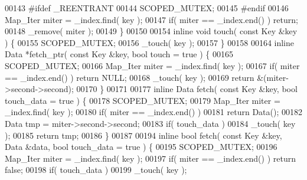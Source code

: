 \begin{DoxyCode}
00143 \textcolor{preprocessor}{#ifdef \_REENTRANT}
00144 \textcolor{preprocessor}{}                        SCOPED\_MUTEX;
00145 \textcolor{preprocessor}{#endif}
00146 \textcolor{preprocessor}{}                        Map_Iter miter = \_index.find( key );
00147                         \textcolor{keywordflow}{if}( miter == \_index.end() ) \textcolor{keywordflow}{return};
00148                         \_remove( miter );
00149                 \}
00150 
00154                 \textcolor{keyword}{inline} \textcolor{keywordtype}{void} touch( \textcolor{keyword}{const} Key &key ) \{
00155                         SCOPED\_MUTEX;
00156                         \_touch( key );
00157                 \}
00158 
00164                 \textcolor{keyword}{inline} Data *fetch_ptr( \textcolor{keyword}{const} Key &key, \textcolor{keywordtype}{bool} touch = \textcolor{keyword}{true} ) \{
00165                         SCOPED\_MUTEX;
00166                         Map_Iter miter = \_index.find( key );
00167                         \textcolor{keywordflow}{if}( miter == \_index.end() ) \textcolor{keywordflow}{return} NULL;
00168                         \_touch( key );
00169                         \textcolor{keywordflow}{return} &(miter->second->second);
00170                 \}
00171 
00177                 \textcolor{keyword}{inline} Data fetch( \textcolor{keyword}{const} Key &key, \textcolor{keywordtype}{bool} touch\_data = \textcolor{keyword}{true} ) \{
00178                         SCOPED\_MUTEX;
00179                         Map_Iter miter = \_index.find( key );
00180                         \textcolor{keywordflow}{if}( miter == \_index.end() )
00181                                 \textcolor{keywordflow}{return} Data();
00182                         Data tmp = miter->second->second;
00183                         \textcolor{keywordflow}{if}( touch\_data )
00184                                 \_touch( key );
00185                         \textcolor{keywordflow}{return} tmp;
00186                 \}
00187 
00194                 \textcolor{keyword}{inline} \textcolor{keywordtype}{bool} fetch( \textcolor{keyword}{const} Key &key, Data &data, \textcolor{keywordtype}{bool} touch\_data = 
      \textcolor{keyword}{true} ) \{
00195                         SCOPED\_MUTEX;
00196                         Map_Iter miter = \_index.find( key );
00197                         \textcolor{keywordflow}{if}( miter == \_index.end() ) \textcolor{keywordflow}{return} \textcolor{keyword}{false};
00198                         \textcolor{keywordflow}{if}( touch\_data )
00199                           \_touch( key );

\end{DoxyCode}
